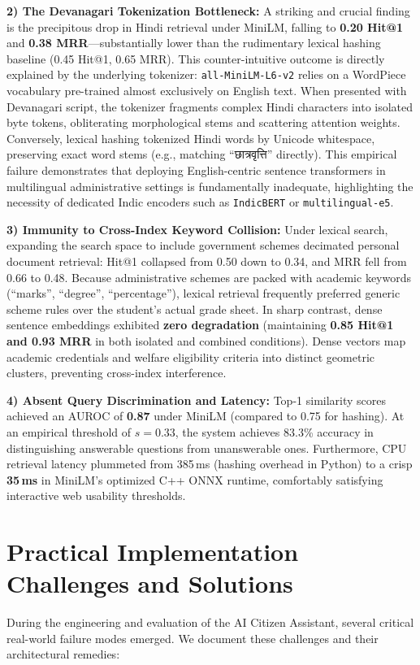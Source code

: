 \documentclass[conference]{IEEEtran}
\begin{document}
\textbf{2) The Devanagari Tokenization Bottleneck:} A striking and crucial finding is the precipitous drop in Hindi retrieval under MiniLM, falling to \textbf{0.20 Hit@1} and \textbf{0.38 MRR}---substantially lower than the rudimentary lexical hashing baseline (0.45 Hit@1, 0.65 MRR). This counter-intuitive outcome is directly explained by the underlying tokenizer: \texttt{all-MiniLM-L6-v2} relies on a WordPiece vocabulary pre-trained almost exclusively on English text. When presented with Devanagari script, the tokenizer fragments complex Hindi characters into isolated byte tokens, obliterating morphological stems and scattering attention weights. Conversely, lexical hashing tokenized Hindi words by Unicode whitespace, preserving exact word stems (e.g., matching ``छात्रवृत्ति'' directly). This empirical failure demonstrates that deploying English-centric sentence transformers in multilingual administrative settings is fundamentally inadequate, highlighting the necessity of dedicated Indic encoders such as \texttt{IndicBERT} or \texttt{multilingual-e5}.

\textbf{3) Immunity to Cross-Index Keyword Collision:} Under lexical search, expanding the search space to include government schemes decimated personal document retrieval: Hit@1 collapsed from 0.50 down to 0.34, and MRR fell from 0.66 to 0.48. Because administrative schemes are packed with academic keywords (``marks'', ``degree'', ``percentage''), lexical retrieval frequently preferred generic scheme rules over the student's actual grade sheet. In sharp contrast, dense sentence embeddings exhibited \textbf{zero degradation} (maintaining \textbf{0.85 Hit@1 and 0.93 MRR} in both isolated and combined conditions). Dense vectors map academic credentials and welfare eligibility criteria into distinct geometric clusters, preventing cross-index interference.

\textbf{4) Absent Query Discrimination and Latency:} Top-1 similarity scores achieved an AUROC of \textbf{0.87} under MiniLM (compared to 0.75 for hashing). At an empirical threshold of $s = 0.33$, the system achieves 83.3\% accuracy in distinguishing answerable questions from unanswerable ones. Furthermore, CPU retrieval latency plummeted from 385\,ms (hashing overhead in Python) to a crisp \textbf{35\,ms} in MiniLM's optimized C++ ONNX runtime, comfortably satisfying interactive web usability thresholds.

\section{Practical Implementation Challenges and Solutions}
During the engineering and evaluation of the AI Citizen Assistant, several critical real-world failure modes emerged. We document these challenges and their architectural remedies:
\end{document}
